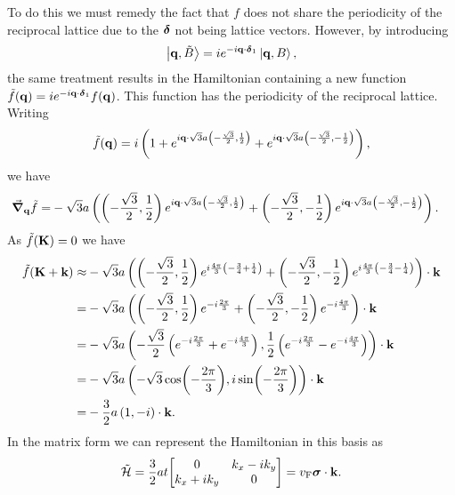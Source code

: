 To do this we must remedy the fact that $f$ does not share the periodicity of the reciprocal lattice due to the $\vb*{\delta}$ not being lattice vectors. However, by introducing
\begin{align*}
	\ket{\vb{q}, \tilde{B}} = ie^{-i\vb{q}\cdot\vb*{\delta}_{1}}\ket{\vb{q}, B},
\end{align*}
the same treatment results in the Hamiltonian containing a new function $\tilde{f}(\vb{q}) = ie^{-i\vb{q}\cdot\vb*{\delta}_{1}}f(\vb{q})$. This function has the periodicity of the reciprocal lattice. Writing
\begin{align*}
	\tilde{f}(\vb{q}) = i\left(1 + e^{i\vb{q}\cdot\sqrt{3}a\left(-\frac{\sqrt{3}}{2}, \frac{1}{2}\right)} + e^{i\vb{q}\cdot\sqrt{3}a\left(-\frac{\sqrt{3}}{2}, -\frac{1}{2}\right)}\right),
\end{align*}
we have
\begin{align*}
	\grad_{\vb{q}}\tilde{f} =& -\sqrt{3}a\left(\left(-\frac{\sqrt{3}}{2}, \frac{1}{2}\right)e^{i\vb{q}\cdot\sqrt{3}a\left(-\frac{\sqrt{3}}{2}, \frac{1}{2}\right)} + \left(-\frac{\sqrt{3}}{2}, -\frac{1}{2}\right)e^{i\vb{q}\cdot\sqrt{3}a\left(-\frac{\sqrt{3}}{2}, -\frac{1}{2}\right)}\right).
\end{align*}
As $\tilde{f}(\vb{K}) = 0$ we have
\begin{align*}
	\tilde{f}(\vb{K} + \vb{k}) \approx& -\sqrt{3}a\left(\left(-\frac{\sqrt{3}}{2}, \frac{1}{2}\right)e^{i\frac{4\pi}{3}\left(-\frac{3}{4} + \frac{1}{4}\right)} + \left(-\frac{\sqrt{3}}{2}, -\frac{1}{2}\right)e^{i\frac{4\pi}{3}\left(-\frac{3}{4} - \frac{1}{4}\right)}\right)\cdot\vb{k} \\
	                                 =& -\sqrt{3}a\left(\left(-\frac{\sqrt{3}}{2}, \frac{1}{2}\right)e^{-i\frac{2\pi}{3}} + \left(-\frac{\sqrt{3}}{2}, -\frac{1}{2}\right)e^{-i\frac{4\pi}{3}}\right)\cdot\vb{k} \\
	                                 =& -\sqrt{3}a\left(-\frac{\sqrt{3}}{2}\left(e^{-i\frac{2\pi}{3}} + e^{-i\frac{4\pi}{3}}\right), \frac{1}{2}\left(e^{-i\frac{2\pi}{3}} - e^{-i\frac{4\pi}{3}}\right)\right)\cdot\vb{k} \\
	                                 =& -\sqrt{3}a\left(-\sqrt{3}\cos(-\frac{2\pi}{3}), i\sin(-\frac{2\pi}{3})\right)\cdot\vb{k} \\
	                                 =& -\frac{3}{2}a\left(1, -i\right)\cdot\vb{k}.
\end{align*}
In the matrix form we can represent the Hamiltonian in this basis as
\begin{align*}
	\tilde{\ham} = \frac{3}{2}at\mqty[
		0               & k_{x} - ik_{y} \\
		k_{x} + ik_{y}  & 0 \\
	] = v_{\text{F}}\vb*{\sigma}\cdot\vb{k}.
\end{align*}
